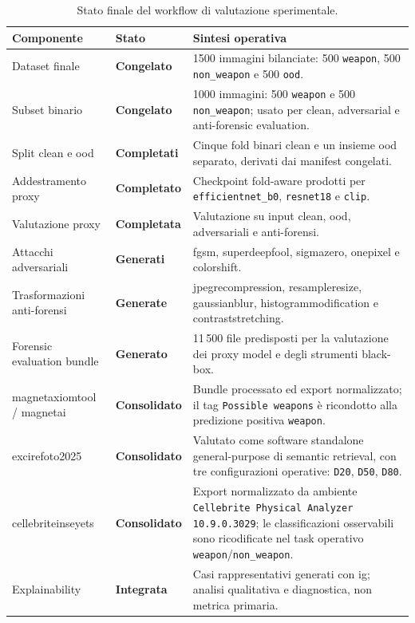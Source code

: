 \begin{table}[H]
\centering
\scriptsize
\renewcommand{\arraystretch}{1.15}
\setlength{\tabcolsep}{4pt}
\caption{Stato finale del workflow di valutazione sperimentale.}
\label{tab:results-evaluation-status}
\begin{tabularx}{\textwidth}{@{}p{} p{} X@{}}
\toprule
\textbf{Componente} & \textbf{Stato} & \textbf{Sintesi operativa} \\
\midrule
Dataset finale & \textbf{Congelato} & 1500 immagini bilanciate: 500 \texttt{weapon}, 500 \texttt{non\_weapon} e 500 \texttt{ood}. \\
Subset binario & \textbf{Congelato} & 1000 immagini: 500 \texttt{weapon} e 500 \texttt{non\_weapon}; usato per clean, adversarial e anti-forensic evaluation. \\
Split clean e \gls{ood} & \textbf{Completati} & Cinque fold binari clean e un insieme \gls{ood} separato, derivati dai manifest congelati. \\
Addestramento proxy & \textbf{Completato} & Checkpoint fold-aware prodotti per \texttt{efficientnet\_b0}, \texttt{resnet18} e \texttt{clip}. \\
Valutazione proxy & \textbf{Completata} & Valutazione su input clean, \gls{ood}, adversariali e anti-forensi. \\
Attacchi adversariali & \textbf{Generati} & \gls{fgsm}, \gls{superdeepfool}, \gls{sigmazero}, \gls{onepixel} e \gls{colorshift}. \\
Trasformazioni anti-forensi & \textbf{Generate} & \gls{jpegrecompression}, \gls{resampleresize}, \gls{gaussianblur}, \gls{histogrammodification} e \gls{contraststretching}. \\
Forensic evaluation bundle & \textbf{Generato} & 11\,500 file predisposti per la valutazione dei proxy model e degli strumenti black-box. \\
\gls{magnetaxiomtool} / \gls{magnetai} & \textbf{Consolidato} & Bundle processato ed export normalizzato; il tag \texttt{Possible weapons} è ricondotto alla predizione positiva \texttt{weapon}. \\
\gls{excirefoto2025} & \textbf{Consolidato} & Valutato come software standalone general-purpose di semantic retrieval, con tre configurazioni operative: \texttt{D20}, \texttt{D50}, \texttt{D80}. \\
\gls{cellebriteinseyets} & \textbf{Consolidato} & Export normalizzato da ambiente \texttt{Cellebrite Physical Analyzer 10.9.0.3029}; le classificazioni osservabili sono ricodificate nel task operativo \texttt{weapon}/\texttt{non\_weapon}. \\
Explainability & \textbf{Integrata} & Casi rappresentativi generati con \gls{ig}; analisi qualitativa e diagnostica, non metrica primaria. \\
\bottomrule
\end{tabularx}
\end{table}

